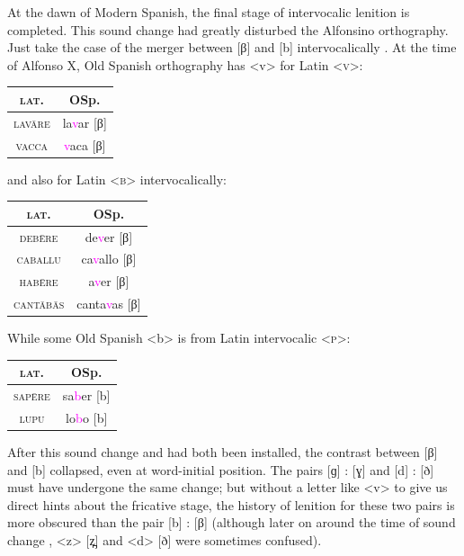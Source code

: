 \documentclass{report}[12pt]
\begin{document}
At the dawn of Modern Spanish, the final stage of intervocalic lenition is completed. This sound change had greatly disturbed the Alfonsino orthography. Just take the case of the merger between [β] and [b] intervocalically \parencite[p.~279]{hualde_sp}. At the time of Alfonso X, Old Spanish orthography has <v> for Latin \textsc{<v>}:
\begin{center}
  \begin{tabular}{c c}
    \textsc{lat.} & OSp. \\
    \hline
    \textsc{lav\={a}re} & la\textcolor{magenta}{v}ar [β] \\
    \textsc{vacca} & \textcolor{magenta}{v}aca [β] \\
  \end{tabular}
\end{center}
and also for Latin \textsc{<b>} intervocalically:
\begin{center}
  \begin{tabular}{c c}
    \textsc{lat.} & OSp. \\
    \hline
    \textsc{deb\={e}re} & de\textcolor{magenta}{v}er [β] \\
    \textsc{caballu} & ca\textcolor{magenta}{v}allo [β] \\
    \textsc{hab\={e}re} & a\textcolor{magenta}{v}er [β] \\
    \textsc{cant\={a}b\={a}s} & canta\textcolor{magenta}{v}as [β] \\
  \end{tabular}
\end{center}
While some Old Spanish <b> is from Latin intervocalic \textsc{<p>}:
\begin{center}
  \begin{tabular}{c c}
    \textsc{lat.} & OSp. \\
    \hline
    \textsc{sap\={e}re} & sa\textcolor{magenta}{b}er [b] \\
    \textsc{lupu} & lo\textcolor{magenta}{b}o [b] \\
  \end{tabular}
\end{center}
After this sound change and  had both been installed, the contrast between [β] and [b] collapsed, even at word-initial position. The pairs [ɡ] : [ɣ] and [d] : [ð] must have undergone the same change; but without a letter like <v> to give us direct hints about the fricative stage, the history of lenition for these two pairs is more obscured than the pair [b] : [β] (although later on around the time of sound change , <z> [z̪] and <d> [ð] were sometimes confused). \\
\end{document}
